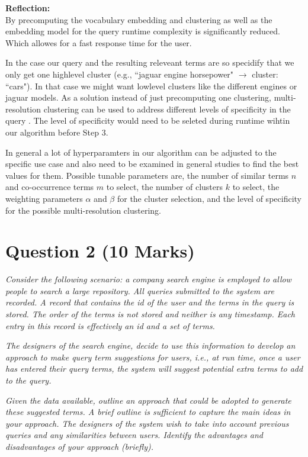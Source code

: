 \textbf{Reflection:}\\
By precomputing the vocabulary embedding and clustering as well as the embedding model for the query runtime complexity is significantly reduced. Which allowes for a fast response time for the user. 

In the case our query and the resulting releveant terms are so specidify that we only get one highlevel cluster (e.g., ``jaguar engine horsepower" $\rightarrow$ cluster: ``cars"). In that case we might want lowlevel clusters like the different engines or jaguar models. As a solution instead of just precomputing one clustering, multi-resolution clustering can be used to address different levels of specificity in the query \cite{lutov2019accuracy}. The level of specificity would need to be seleted during runtime wihtin our algorithm before Step 3.

In general a lot of hyperparamters in our algorithm can be adjusted to the specific use case and also need to be examined in general studies to find the best values for them. Possible tunable parameters are, the number of similar terms $n$ and co-occurrence terms $m$ to select, the number of clusters $k$ to select, the weighting parameters $\alpha$ and $\beta$ for the cluster selection, and the level of specificity for the possible multi-resolution clustering.


\newpage
\section{Question 2 (10 Marks)}

\textit{Consider the following scenario: a company search engine is employed to allow people to search a large repository. All queries submitted to the system are recorded. A record that contains the id of the user and the terms in the query is stored. The order of the terms is not stored and neither is any timestamp. Each entry in this record is effectively an id and a set of terms.}

\textit{The designers of the search engine, decide to use this information to develop an approach to make query term suggestions for users, i.e., at run time, once a user has entered their query terms, the system will suggest potential extra terms to add to the query.}

\textit{Given the data available, outline an approach that could be adopted to generate these suggested terms. A brief outline is sufficient to capture the main ideas in your approach. The designers of the system wish to take into account previous queries and any similarities between users. Identify the advantages and disadvantages of your approach (briefly).}

